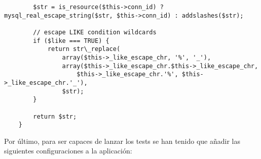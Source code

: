 \begin{itemize}
\begin{lstlisting}
        $str = is_resource($this->conn_id) ? mysql_real_escape_string($str, $this->conn_id) : addslashes($str);

        // escape LIKE condition wildcards
        if ($like === TRUE) {
            return str\_replace(
                array($this->_like_escape_chr, '%', '_'),
                array($this->_like_escape_chr.$this->_like_escape_chr,
                    $this->_like_escape_chr.'%', $this->_like_escape_chr.'_'),
                $str);
        }

        return $str;
    }
                \end{lstlisting}

\end{itemize}

Por último, para ser capaces de lanzar los tests se han tenido que añadir las siguientes configuraciones a la aplicación:

